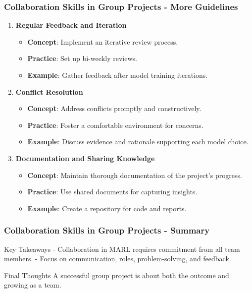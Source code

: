 \documentclass[aspectratio=169]{beamer}
\begin{document}
\begin{frame}[fragile]
    \frametitle{Collaboration Skills in Group Projects - More Guidelines}
    \begin{enumerate}[resume]
        \item \textbf{Regular Feedback and Iteration}
        \begin{itemize}
            \item \textbf{Concept}: Implement an iterative review process.
            \item \textbf{Practice}: Set up bi-weekly reviews.
            \item \textbf{Example}: Gather feedback after model training iterations.
        \end{itemize}

        \item \textbf{Conflict Resolution}
        \begin{itemize}
            \item \textbf{Concept}: Address conflicts promptly and constructively.
            \item \textbf{Practice}: Foster a comfortable environment for concerns.
            \item \textbf{Example}: Discuss evidence and rationale supporting each model choice.
        \end{itemize}
        
        \item \textbf{Documentation and Sharing Knowledge}
        \begin{itemize}
            \item \textbf{Concept}: Maintain thorough documentation of the project's progress.
            \item \textbf{Practice}: Use shared documents for capturing insights.
            \item \textbf{Example}: Create a repository for code and reports.
        \end{itemize}
    \end{enumerate}
\end{frame}

\begin{frame}[fragile]
    \frametitle{Collaboration Skills in Group Projects - Summary}
    \begin{block}{Key Takeaways}
        - Collaboration in MARL requires commitment from all team members.
        - Focus on communication, roles, problem-solving, and feedback.
    \end{block}
    \begin{block}{Final Thoughts}
        A successful group project is about both the outcome and growing as a team.
    \end{block}
\end{frame}
\end{document}
